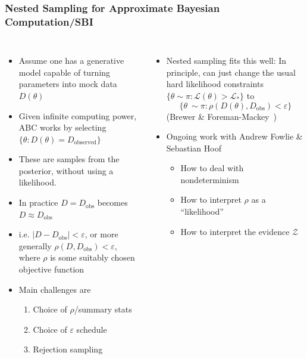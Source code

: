 \documentclass[aspectratio=169,handout]{beamer}
\begin{document}
\begin{frame}
    \frametitle{Nested Sampling for Approximate Bayesian Computation/SBI}
    \begin{columns}
        \begin{itemize}
            \item Assume one has a generative model capable of turning parameters into mock data $D(\theta)$
            \item Given infinite computing power, ABC works by selecting $\{\theta : D(\theta)=D_\mathrm{observed}\}$
            \item These are samples from the posterior, without using a likelihood.
            \item In practice $D=D_\mathrm{obs}$ becomes $D\approx D_\mathrm{obs}$
            \item i.e. $|D-D_\mathrm{obs}|<\varepsilon$, or more generally $\boxed{\rho(D,D_\mathrm{obs})<\varepsilon}$, where $\rho$ is some suitably chosen objective function
            \item Main challenges are 
                \begin{enumerate}
                    \item Choice of $\rho$/summary stats
                    \item Choice of $\varepsilon$ schedule
                    \item Rejection sampling
                \end{enumerate}
        \end{itemize}
        \begin{itemize}
            \item Nested sampling fits this well: In principle, can just change the usual hard likelihood constraints $\{\theta\sim\pi : \mathcal{L}(\theta)>\mathcal{L}_*\}$ to
                \[\{\theta~\sim\pi : \rho(D(\theta),D_\mathrm{obs})<\varepsilon\}\]
            (Brewer \& Foreman-Mackey~)
            \item Ongoing work with Andrew Fowlie \& Sebastian Hoof
                \begin{itemize}
                    \item How to deal with nondeterminism 
                    \item How to interpret $\rho$ as a ``likelihood''
                    \item How to interpret the evidence $\mathcal{Z}$
                \end{itemize}
        \end{itemize}
    \end{columns}
\end{frame}
\end{document}
